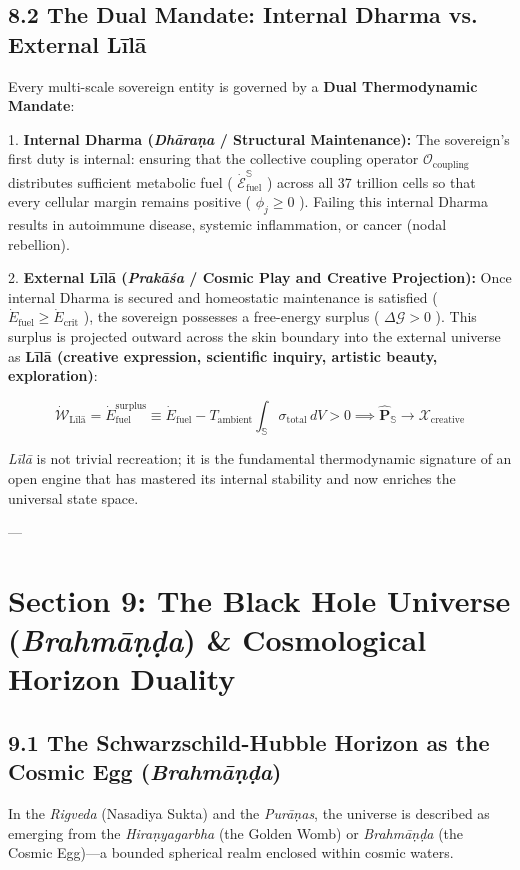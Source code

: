 \documentclass[11pt,a4paper]{article}
\theoremstyle{definition}
\theoremstyle{remark}
\begin{document}
\subsection{8.2 The Dual Mandate: Internal Dharma vs. External Līlā}
Every multi-scale sovereign entity is governed by a \textbf{Dual Thermodynamic Mandate}:

1. \textbf{Internal Dharma (\textit{Dhāraṇa} / Structural Maintenance):}
The sovereign's first duty is internal: ensuring that the collective coupling operator $\mathcal{O}_{\text{coupling}}$ distributes sufficient metabolic fuel ( $\dot{\mathcal{E}}_{\text{fuel}}^{\mathbb{S}}$ ) across all 37 trillion cells so that every cellular margin remains positive ( $\phi_j \ge 0$ ). Failing this internal Dharma results in autoimmune disease, systemic inflammation, or cancer (nodal rebellion).

2. \textbf{External Līlā (\textit{Prakāśa} / Cosmic Play and Creative Projection):}
Once internal Dharma is secured and homeostatic maintenance is satisfied ( $\dot{E}_{\text{fuel}} \ge \dot{E}_{\text{crit}}$ ), the sovereign possesses a free-energy surplus ( $\Delta \mathcal{G} > 0$ ). This surplus is projected outward across the skin boundary into the external universe as \textbf{Līlā (creative expression, scientific inquiry, artistic beauty, exploration)}:


\begin{equation}
\boxed{\dot{\mathcal{W}}_{\text{Līlā}} = \dot{E}_{\text{fuel}}^{\text{surplus}} \equiv \dot{E}_{\text{fuel}} - T_{\text{ambient}} \int_{\mathbb{S}} \sigma_{\text{total}} \, dV > 0 \implies \hat{\mathbf{P}}_{\mathbb{S}} \longrightarrow \boldsymbol{\mathcal{X}}_{\text{creative}}}
\end{equation}


\textit{Līlā} is not trivial recreation; it is the fundamental thermodynamic signature of an open engine that has mastered its internal stability and now enriches the universal state space.

---

\section{Section 9: The Black Hole Universe (\textit{Brahmāṇḍa}) \& Cosmological Horizon Duality}

\subsection{9.1 The Schwarzschild-Hubble Horizon as the Cosmic Egg (\textit{Brahmāṇḍa})}
In the \textit{Rigveda} (Nasadiya Sukta) and the \textit{Purāṇas}, the universe is described as emerging from the \textit{Hiraṇyagarbha} (the Golden Womb) or \textit{Brahmāṇḍa} (the Cosmic Egg)—a bounded spherical realm enclosed within cosmic waters.
\end{document}

